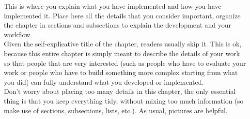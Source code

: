 This is where you explain what you have implemented and how you have implemented it. Place here all the details that you consider important, organize the chapter in sections and subsections to explain the development and your workflow.\\Given the self-explicative title of the chapter, readers usually skip it. This is ok, because this entire chapter is simply meant to describe the details of your work so that people that are very interested (such as people who have to evaluate your work or people who have to build something more complex starting from what you did) can fully understand what you developed or implemented.\\Don't worry about placing too many details in this chapter, the only essential thing is that you keep everything tidy, without mixing too much information (so make use of sections, subsections, lists, etc.). As usual, pictures are helpful.
